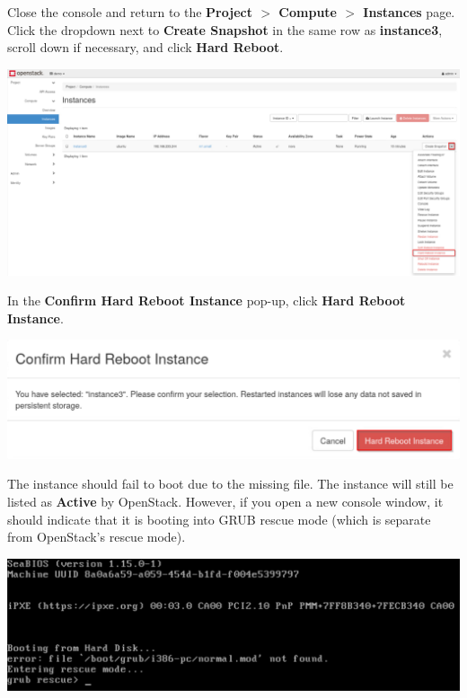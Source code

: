 \documentclass[letterpaper, 12pt]{article}
\begin{document}
\begin{enumerate}
    \begin{labstep}
        Close the console and return to the \textbf{Project $>$ Compute $>$ Instances} page.
        Click the dropdown next to \textbf{Create Snapshot} in the same row as \textbf{instance3}, scroll down if necessary, and click \textbf{Hard Reboot}.

        \begin{center}
            \includegraphics[width=\linewidth]{images/part7/step11.png}
        \end{center}
    \end{labstep}

    \begin{labstep}
        In the \textbf{Confirm Hard Reboot Instance} pop-up, click \textbf{Hard Reboot Instance}.

        \begin{center}
            \includegraphics[width=\linewidth]{images/part7/step12.png}
        \end{center}
    \end{labstep}

    \begin{labstep}
        The instance should fail to boot due to the missing file.
        The instance will still be listed as \textbf{Active} by OpenStack.
        However, if you open a new console window, it should indicate that it is booting into GRUB rescue mode (which is separate from OpenStack's rescue mode).

        \begin{center}
            \includegraphics[width=\linewidth]{images/part7/step13.png}
        \end{center}
    \end{labstep}


\end{enumerate}
\end{document}
